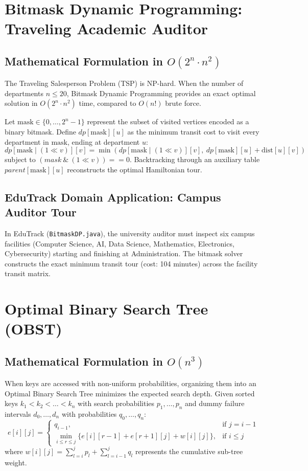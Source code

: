 \section{Bitmask Dynamic Programming: Traveling Academic Auditor}
\subsection{Mathematical Formulation in $O(2^n \cdot n^2)$}
The Traveling Salesperson Problem (TSP) is NP-hard. When the number of departments $n \le 20$, Bitmask Dynamic Programming provides an exact optimal solution in $O(2^n \cdot n^2)$ time, compared to $O(n!)$ brute force.

Let $\text{mask} \in \{0, \dots, 2^n - 1\}$ represent the subset of visited vertices encoded as a binary bitmask. Define $dp[\text{mask}][u]$ as the minimum transit cost to visit every department in $\text{mask}$, ending at department $u$:
\begin{equation}
dp[\text{mask} \mid (1 \ll v)][v] = \min \left( dp[\text{mask} \mid (1 \ll v)][v], \ dp[\text{mask}][u] + \text{dist}[u][v] \right)
\end{equation}
subject to $(mask \ \& \ (1 \ll v)) == 0$. Backtracking through an auxiliary table $parent[\text{mask}][u]$ reconstructs the optimal Hamiltonian tour.

\subsection{EduTrack Domain Application: Campus Auditor Tour}
In EduTrack (\texttt{BitmaskDP.java}), the university auditor must inspect six campus facilities (Computer Science, AI, Data Science, Mathematics, Electronics, Cybersecurity) starting and finishing at Administration. The bitmask solver constructs the exact minimum transit tour (cost: 104 minutes) across the facility transit matrix.

\section{Optimal Binary Search Tree (OBST)}
\subsection{Mathematical Formulation in $O(n^3)$}
When keys are accessed with non-uniform probabilities, organizing them into an Optimal Binary Search Tree minimizes the expected search depth. Given sorted keys $k_1 < k_2 < \dots < k_n$ with search probabilities $p_1, \dots, p_n$ and dummy failure intervals $d_0, \dots, d_n$ with probabilities $q_0, \dots, q_n$:
\begin{equation}
e[i][j] = \begin{cases}
q_{i-1}, & \text{if } j = i - 1 \\
\min_{i \le r \le j} \{ e[i][r-1] + e[r+1][j] + w[i][j] \}, & \text{if } i \le j
\end{cases}
\end{equation}
where $w[i][j] = \sum_{l=i}^j p_l + \sum_{l=i-1}^j q_l$ represents the cumulative sub-tree weight.

